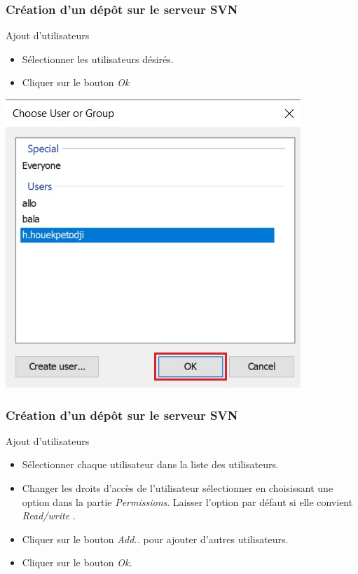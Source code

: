 \documentclass{beamer}
\begin{document}
\begin{frame}
\frametitle{Création d'un dépôt sur le serveur SVN}
\begin{block}{Ajout d'utilisateurs}
\begin{itemize}
\item Sélectionner les utilisateurs désirés.
\item Cliquer sur le bouton \alert{\textit{Ok}}
\end{itemize}
\end{block}
\includegraphics[scale=.5]{../images/server11.jpg}
\end{frame}

\begin{frame}
\frametitle{Création d'un dépôt sur le serveur SVN}
\begin{block}{Ajout d'utilisateurs}
\begin{itemize}
\item Sélectionner chaque utilisateur dans la liste des utilisateurs.
\item Changer les droits d'accès de l'utilisateur sélectionner en choisissant une option dans la partie \alert{\textit{Permissions}}. Laisser l'option par défaut si elle convient \alert{\textit{Read/write}} .
\item Cliquer sur le bouton  \alert{\textit{Add..}} pour ajouter d'autres utilisateurs.
\item Cliquer sur le bouton \alert{\textit{Ok}}.
\end{itemize}
\end{block}
\end{frame}
\end{document}
